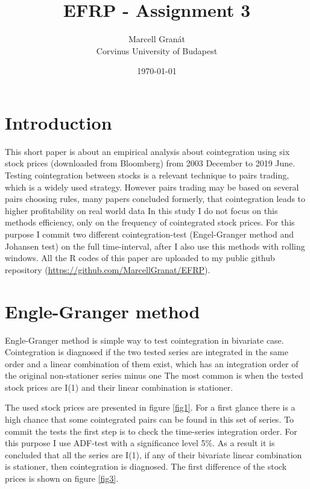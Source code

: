 \documentclass[12pt, a4paper, twoside, titlepage]{article}
\title{EFRP - Assignment 3}
\date{\today}
\author{Marcell Granát \\ Corvinus University of Budapest}
\begin{document}
  \maketitle
  \tableofcontents
  

\section*{Introduction}
\setcounter{page}{1}

This short paper is about an empirical analysis about cointegration using six stock prices (downloaded from Bloomberg) from 2003 December to 2019 June. Testing cointegration between stocks is a relevant technique to pairs trading, which is a widely used strategy. However pairs trading may be based on several pairs choosing rules, many papers concluded formerly, that cointegration leads to higher profitability on real world data
In this study I do not focus on this methods efficiency, only on the frequency of cointegrated stock prices. For this purpose I commit two different cointegration-test (Engel-Granger method and Johansen test) on the full time-interval, after I also use this methods with rolling windows. All the R codes of this paper are uploaded to my public github repository (\href{https://github.com/MarcellGranat/EFRP/blob/master/Exercise-3.md}{https://github.com/MarcellGranat/EFRP}). 

\section*{Engle-Granger method}

Engle-Granger method is simple way to test cointegration in bivariate case. Cointegration is diagnosed if the two tested series are integrated in the same order and a linear combination of them exist, which has an integration order of the original non-stationer series minus one %
The most common is when the tested stock prices are I(1) and their linear combination is stationer.

The used stock prices are presented in figure \ref{fig1}. For a first glance there is a high chance that some cointegrated pairs can be found in this set of series. To commit the tests the first step is to check the time-series integration order. For this purpose I use ADF-test with a significance level 5\%. As a result it is concluded that all the series are I(1), if any of their bivariate linear combination is stationer, then cointegration is diagnosed. The first difference of the stock prices is shown on figure \ref{fig3}.
\end{document}
